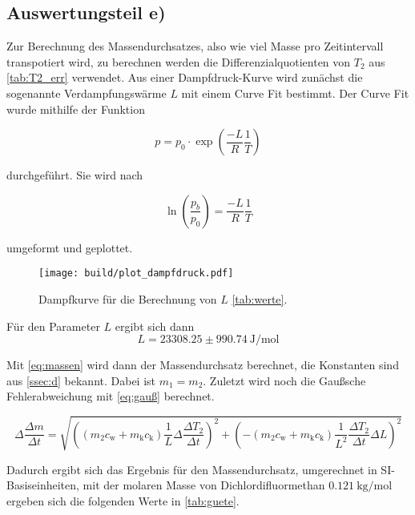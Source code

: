 \subsection{Auswertungsteil e)}
\label{ssec:e}

Zur Berechnung des Massendurchsatzes, also wie viel Masse pro Zeitintervall transpotiert wird, zu berechnen werden die Differenzialquotienten von $T_2$ aus \autoref{tab:T2_err} verwendet.
Aus einer Dampfdruck-Kurve wird zunächst die sogenannte Verdampfungswärme $L$ mit einem Curve Fit bestimmt. 
Der Curve Fit wurde mithilfe der Funktion

\begin{equation}
    p = p_0 \cdot \exp{\left(\frac{-L}{R}\frac{1}{T}\right)}
    \label{eq:L}
\end{equation}

durchgeführt. Sie wird nach 

\begin{equation}
    \ln{\left(\frac{p_b}{p_0}\right)} = \frac{-L}{R} \frac{1}{T}
    \label{eq:L2}
\end{equation}

umgeformt und geplottet.

\begin{figure}
    \centering
    \texttt{[image: build/plot\_dampfdruck.pdf]}
    \caption{Dampfkurve für die Berechnung von $L$ \autoref{tab:werte}.\cite{numpy}}
    \label{fig:dampfdruck_plot}
\end{figure}

Für den Parameter $L$ ergibt sich dann
\begin{equation*}
    L = 23308.25 \pm \SI{990.74}{\joule \per \mol}
    \label{eq:L3}
\end{equation*}

Mit \autoref{eq:massen} wird dann der Massendurchsatz berechnet, die Konstanten sind aus \autoref{ssec:d} bekannt. Dabei ist $m_1 = m_2$. 
Zuletzt wird noch die Gaußsche Fehlerabweichung mit \autoref{eq:gauß} berechnet.

\begin{equation}
    \Delta\frac{\Delta m}{\Delta t} = \sqrt{\left((m_2 c_\text{w} + m_\text{k} c_\text{k}) \frac{1}{L} \Delta \frac{\Delta T_2}{\Delta t}\right)^2 + \left(-(m_2 c_\text{w} + m_\text{k} c_\text{k}) \frac{1}{L^2} \frac{\Delta T_2}{\Delta t} \Delta L\right)^2}
    \label{eq:m_err}
\end{equation}

Dadurch ergibt sich das Ergebnis für den Massendurchsatz, umgerechnet in SI-Basiseinheiten, mit der molaren Masse von Dichlordifluormethan $\SI{0.121}{\kilogram \per \mol}$ ergeben sich die folgenden Werte in \autoref{tab:guete}. \cite{dichte_CL2F2C}


